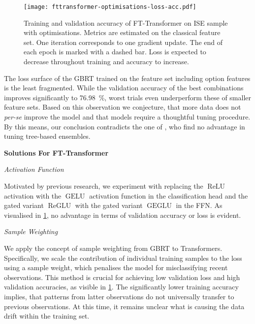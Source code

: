 \begin{figure}[!ht]
    \centering
    \texttt{[image: fttransformer-optimisations-loss-acc.pdf]}
    \caption[Training and Validation Accuracy of FT-Transformer on  with Optimisations]{Training and validation accuracy of FT-Transformer on \gls{ISE} sample with optimisations. Metrics are estimated on the classical feature set. One iteration corresponds to one gradient update. The end of each epoch is marked with a dashed bar. Loss is expected to decrease throughout training and accuracy to increase.}
    \label{fig:fttransformer-optimisations-loss-acc}
\end{figure}
The loss surface of the \gls{GBRT} trained on the feature set including option features is the least fragmented. While the validation accuracy of the best combinations improves significantly to \SI{76.98}{\percent}, worst trials even underperform these of smaller feature sets. Based on this observation we conjecture, that more data does not \emph{per-se} improve the model and that models require a thoughtful tuning procedure. By this means, our conclusion contradicts the one of \textcite[][14]{ronenMachineLearningTrade2022}, who find no advantage in tuning tree-based ensembles.

\textbf{Solutions For FT-Transformer}

\emph{Activation Function}

Motivated by previous research, we experiment with replacing the $\operatorname{ReLU}$ activation with the $\operatorname{GELU}$ activation function \autocite[][2]{hendrycksGaussianErrorLinear2020} in the classification head and the gated variant $\operatorname{ReGLU}$ with the gated variant $\operatorname{GEGLU}$ \autocite[][2]{shazeerGLUVariantsImprove2020} in the \gls{FFN}. As visualised in \cref{fig:fttransformer-optimisations-loss-acc}, no advantage in terms of validation accuracy or loss is evident.

\emph{Sample Weighting}

We apply the concept of sample weighting from \gls{GBRT} to Transformers. Specifically, we scale the contribution of individual training samples to the loss using a sample weight, which penalises the model for misclassifying recent observations. This method is crucial for achieving low validation loss and high validation accuracies, as visible in \cref{fig:fttransformer-optimisations-loss-acc}. The significantly lower training accuracy implies, that patterns from latter observations do not universally transfer to previous observations. At this time, it remains unclear what is causing the data drift within the training set.


